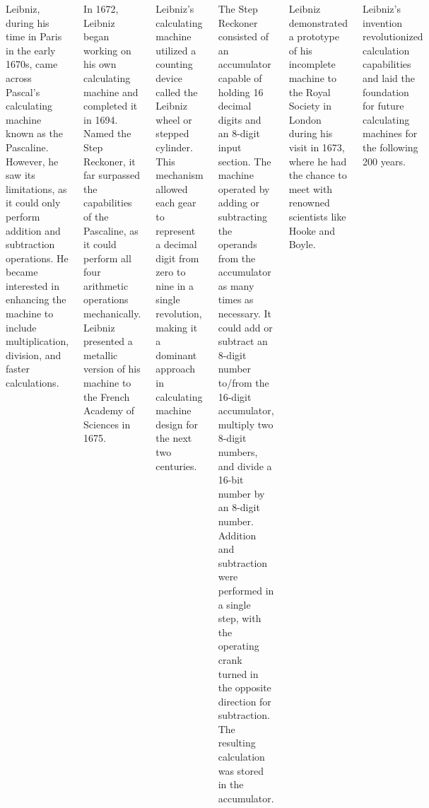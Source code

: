 \documentclass[
    margin=1in,
    innermargin=-4.5in,
    ]{tikzposter}
\begin{document}
\begin{columns}
{        \vspace{1cm}
    
        Leibniz, during his time in Paris in the early 1670s, came across Pascal's calculating machine known as the Pascaline. However, he saw its limitations, as it could only perform addition and subtraction operations. He became interested in enhancing the machine to include multiplication, division, and faster calculations.
        
        In 1672, Leibniz began working on his own calculating machine and completed it in 1694. Named the Step Reckoner, it far surpassed the capabilities of the Pascaline, as it could perform all four arithmetic operations mechanically. Leibniz presented a metallic version of his machine to the French Academy of Sciences in 1675.

        Leibniz's calculating machine utilized a counting device called the Leibniz wheel or stepped cylinder. This mechanism allowed each gear to represent a decimal digit from zero to nine in a single revolution, making it a dominant approach in calculating machine design for the next two centuries. 
        
        The Step Reckoner consisted of an accumulator capable of holding 16 decimal digits and an 8-digit input section. The machine operated by adding or subtracting the operands from the accumulator as many times as necessary. It could add or subtract an 8-digit number to/from the 16-digit accumulator, multiply two 8-digit numbers, and divide a 16-bit number by an 8-digit number. Addition and subtraction were performed in a single step, with the operating crank turned in the opposite direction for subtraction. The resulting calculation was stored in the accumulator.

        Leibniz demonstrated a prototype of his incomplete machine to the Royal Society in London during his visit in 1673, where he had the chance to meet with renowned scientists like Hooke and Boyle. 
        
        Leibniz's invention revolutionized calculation capabilities and laid the foundation for future calculating machines for the following 200 years.
        }


\end{columns}
\end{document}
